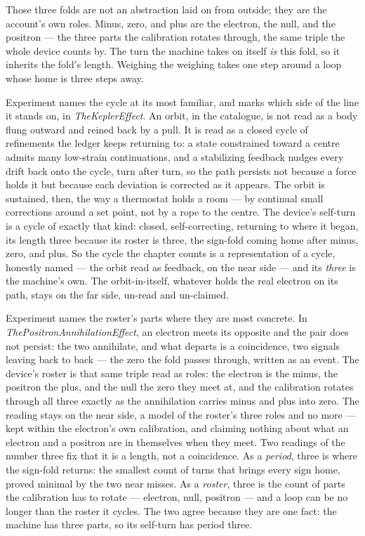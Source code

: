 Those three folds are not an abstraction laid on from outside; they are the account's own roles.
Minus, zero, and plus are the electron, the null, and the positron --- the three parts the calibration rotates through,
the same triple the whole device counts by.
The turn the machine takes on itself \emph{is} this fold, so it inherits the fold's length.
Weighing the weighing takes one step around a loop whose home is three steps away.

Experiment names the cycle at its most familiar, and marks which side of the line it stands on, in \emph{TheKeplerEffect}.
An orbit, in the catalogue, is not read as a body flung outward and reined back by a pull.
It is read as a closed cycle of refinements the ledger keeps returning to: a state constrained toward a centre admits
many low-strain continuations, and a stabilizing feedback nudges every drift back onto the cycle, turn after turn, so the
path persists not because a force holds it but because each deviation is corrected as it appears.
The orbit is sustained, then, the way a thermostat holds a room --- by continual small corrections around a set point, not
by a rope to the centre.
The device's self-turn is a cycle of exactly that kind: closed, self-correcting, returning to where it began, its length
three because its roster is three, the sign-fold coming home after minus, zero, and plus.
So the cycle the chapter counts is a representation of a cycle, honestly named --- the orbit read as feedback, on the near
side --- and its \emph{three} is the machine's own.
The orbit-in-itself, whatever holds the real electron on its path, stays on the far side, un-read and un-claimed.

Experiment names the roster's parts where they are most concrete.
In \emph{ThePositronAnnihilationEffect}, an electron meets its opposite and the pair does not persist: the two annihilate,
and what departs is a coincidence, two signals leaving back to back --- the zero the fold passes through, written as an
event.
The device's roster is that same triple read as roles: the electron is the minus, the positron the plus, and the null the
zero they meet at, and the calibration rotates through all three exactly as the annihilation carries minus and plus into
zero.
The reading stays on the near side, a model of the roster's three roles and no more --- kept within the electron's own
calibration, and claiming nothing about what an electron and a positron are in themselves when they meet.
Two readings of the number three fix that it is a length, not a coincidence.
As a \emph{period}, three is where the sign-fold returns: the smallest count of turns that brings every sign home, proved
minimal by the two near misses.
As a \emph{roster}, three is the count of parts the calibration has to rotate --- electron, null, positron --- and a loop
can be no longer than the roster it cycles.
The two agree because they are one fact: the machine has three parts, so its self-turn has period three.

